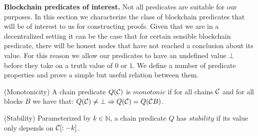 

\medskip
\noindent
{\bf Blockchain predicates of interest.}
Not all predicates are suitable for our purposes. In this section we characterize the class of
blockchain predicates that will be of interest to us for constructing proofs.
Given that we are in a decentralized setting it can be the case that for certain
sensible blockchain predicate, there will be honest nodes that have not reached
a conclusion about its value. For this reason we allow our predicates to have an
undefined value $\bot$ before they take on a truth value of $0$ or $1$. We
define a number of predicate properties and prove a simple but useful relation
between them.

\begin{definition}{(Monotonicity)}
    A chain predicate $Q(\mathcal{C})$ is $\textit{monotonic}$ if for all chains
    $\mathcal{C}$ and for all blocks $B$ we have that:
    $Q(\mathcal{C}) \neq \bot \Rightarrow Q(\mathcal{C}) = Q(\mathcal{C} B)$.

\noindent
 {(Stability)}
    Parameterized by $k \in \mathbb{N}$, a chain predicate
    $Q$ has $\textit{stability}$ if its value only depends on $\mathcal{C}[:-k]$.

\end{definition}
%

